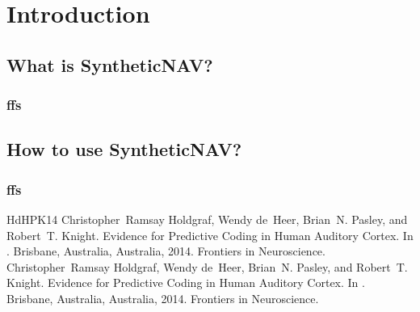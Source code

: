 \documentclass[letterpaper,10pt,english]{jupyterBook}
\begin{document}
\chapter{Introduction}
\label{\detokenize{src/test/SyntheticNAV:introduction}}

\section{What is SyntheticNAV?}
\label{\detokenize{src/test/SyntheticNAV:what-is-syntheticnav}}

\subsection{ffs}
\label{\detokenize{src/test/SyntheticNAV:ffs}}

\section{How to use SyntheticNAV?}
\label{\detokenize{src/test/SyntheticNAV:how-to-use-syntheticnav}}

\subsection{ffs}
\label{\detokenize{src/test/SyntheticNAV:id1}}
\begin{sphinxthebibliography}{HdHPK14}
\sphinxAtStartPar
Christopher Ramsay Holdgraf, Wendy de Heer, Brian N. Pasley, and Robert T. Knight. Evidence for Predictive Coding in Human Auditory Cortex. In . Brisbane, Australia, Australia, 2014. Frontiers in Neuroscience.
\sphinxAtStartPar
Christopher Ramsay Holdgraf, Wendy de Heer, Brian N. Pasley, and Robert T. Knight. Evidence for Predictive Coding in Human Auditory Cortex. In . Brisbane, Australia, Australia, 2014. Frontiers in Neuroscience.
\end{sphinxthebibliography}







\renewcommand{\indexname}{Index}
\printindex
\end{document}
